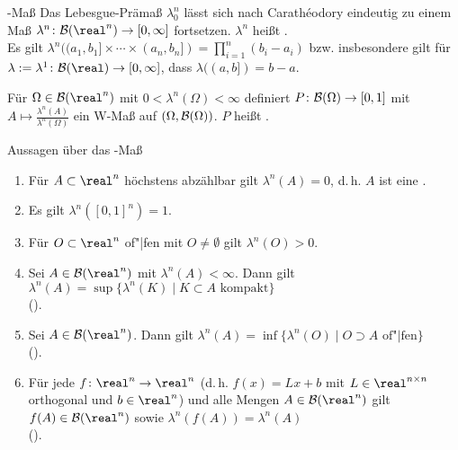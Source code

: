 \linie

\begin{Def}{-Maß}
    Das Lebesgue-Prämaß $\lambda_0^n$ lässt sich nach Carathéodory eindeutig zu einem Maß
    $\lambda^n\colon \B(\real^n) \rightarrow [0, \infty]$ fortsetzen.
    $\lambda^n$ heißt .\\
    Es gilt $\lambda^n((a_1, b_1] \times \dotsb \times (a_n, b_n]) = \prod_{i=1}^n (b_i - a_i)$
    bzw. insbesondere gilt für\\
    $\lambda := \lambda^1\colon \B(\real) \rightarrow [0, \infty]$,
    dass $\lambda((a, b]) = b - a$.
\end{Def}

\begin{Bsp}
    Für $\Omega \in \B(\real^n)$ mit $0 < \lambda^n(\Omega) < \infty$ definiert
    $P\colon \mathcal{B}(\Omega) \rightarrow [0, 1]$ mit $A \mapsto \frac{\lambda^n(A)}{\lambda^n(\Omega)}$
    ein W-Maß auf $(\Omega, \mathcal{B}(\Omega))$.
    $P$ heißt .
\end{Bsp}

\begin{Satz}{Aussagen über das -Maß}
    \begin{enumerate}
        \item
        Für $A \subset \real^n$ höchstens abzählbar gilt $\lambda^n(A) = 0$,
        d.\,h. $A$ ist eine .
        
        \item
        Es gilt $\lambda^n([0, 1]^n) = 1$.
        
        \item
        Für $O \subset \real^n$ of"|fen mit $O \not= \emptyset$ gilt $\lambda^n(O) > 0$.
        
        \item
        Sei $A \in \B(\real^n)$ mit $\lambda^n(A) < \infty$.
        Dann gilt $\lambda^n(A) = \sup\{\lambda^n(K) \;|\; K \subset A \text{ kompakt}\}$\\
        ().
        
        \item
        Sei $A \in \B(\real^n)$.
        Dann gilt $\lambda^n(A) = \inf\{\lambda^n(O) \;|\; O \supset A \text{ of"|fen}\}$\\
        ().
        
        \item
        Für jede  $f\colon \real^n \rightarrow \real^n$
        (d.\,h. $f(x) = Lx + b$ mit $L \in \real^{n \times n}$ orthogonal und $b \in \real^n$)
        und alle Mengen $A \in \B(\real^n)$ gilt
        $f(A) \in \B(\real^n)$ sowie $\lambda^n(f(A)) = \lambda^n(A)$\\
        ().
    \end{enumerate}
\end{Satz}

